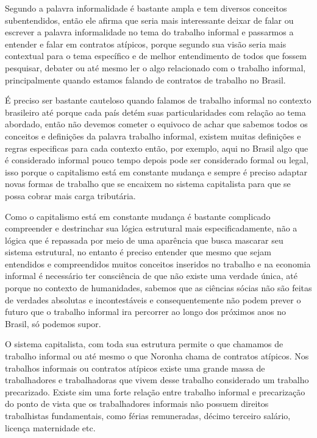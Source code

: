 Segundo \cite{noronha2003informal} a palavra informalidade é bastante ampla e tem diversos conceitos subentendidos, então ele afirma que seria mais interessante deixar de falar ou escrever a palavra informalidade no tema do trabalho informal e passarmos a entender e falar em contratos atípicos, porque segundo sua visão seria mais contextual para o tema específico e de melhor entendimento de todos que fossem pesquisar, debater ou até mesmo ler o algo relacionado com o trabalho informal, principalmente quando estamos falando de contratos de trabalho no Brasil.

É preciso ser bastante cauteloso quando falamos de trabalho informal no contexto brasileiro até porque cada país detém suas particularidades com relação ao tema abordado, então não devemos cometer o equivoco de achar que sabemos todos os conceitos e definições da palavra trabalho informal, existem muitas definições e regras especificas para cada contexto então, por exemplo, aqui no Brasil algo que é considerado informal pouco tempo depois pode ser considerado formal ou legal, isso porque o capitalismo está em constante mudança e sempre é preciso adaptar novas formas de trabalho que se encaixem no sistema capitalista para que se possa cobrar mais carga tributária.

Como o capitalismo está em constante mudança é bastante complicado compreender e destrinchar sua lógica estrutural mais especificadamente, não a lógica que é repassada por meio de uma aparência que busca mascarar seu sistema estrutural, no entanto é preciso entender que mesmo que sejam entendidos e compreendidos muitos conceitos inseridos no trabalho e na economia informal é necessário ter consciência de que não existe uma verdade única, até porque no contexto de humanidades, sabemos que as ciências sócias não são feitas de verdades absolutas e incontestáveis e consequentemente não podem prever o futuro que o trabalho informal ira percorrer ao longo dos próximos anos no Brasil, só podemos supor.

O sistema capitalista, com toda sua estrutura permite o que chamamos de trabalho informal ou até mesmo o que Noronha chama de contratos atípicos. Nos trabalhos informais ou contratos atípicos existe uma grande massa de trabalhadores e trabalhadoras que vivem desse trabalho considerado um trabalho precarizado. Existe sim uma forte relação entre trabalho informal e precarização do ponto de vista que os trabalhadores informais não possuem direitos trabalhistas fundamentais, como férias remuneradas, décimo terceiro salário, licença maternidade etc. 

